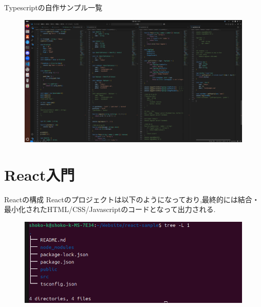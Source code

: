\documentclass[aspectratio=169]{beamer}
\begin{document}
\begin{frame}{Typescriptの自作サンプル一覧}
    \vspace{-1em}
    \begin{figure}
        \centering
        \includegraphics[width=\textwidth,height=\paperheight]{typescript_code.png}
    \end{figure}
\end{frame}

\section{React入門}

\begin{frame}{Reactの構成}
    Reactのプロジェクトは以下のようになっており,最終的には結合・最小化されたHTML/CSS/Javascriptのコードとなって出力される.
    \begin{figure}
        \centering
        \includegraphics[scale = 0.3]{React_tree.png}
    \end{figure}
\end{frame}  
\end{document}
